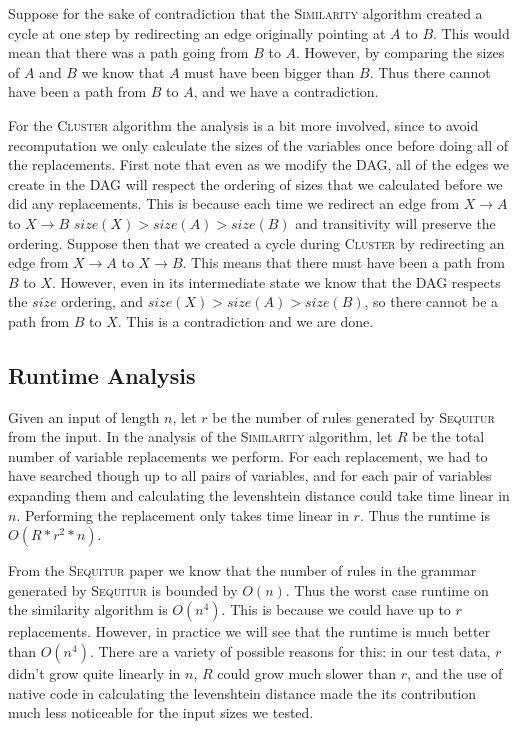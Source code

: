 \documentclass[11pt]{article}
\newcommand{\Sequitur}{\textsc{Sequitur}\xspace}
\newcommand{\Similarity}{\textsc{Similarity}\xspace}
\newcommand{\Cluster}{\textsc{Cluster}\xspace}
\begin{document}
Suppose for the sake of contradiction that the \Similarity algorithm created a
cycle at one step by redirecting an edge originally pointing at $A$ to $B$.
This would mean that there was a path going from $B$ to $A$. However, by
comparing the sizes of $A$ and $B$ we know that $A$ must have been bigger than
$B$. Thus there cannot have been a path from $B$ to $A$, and we have a
contradiction.

For the \Cluster algorithm the analysis is a bit more involved, since to avoid
recomputation we only calculate the sizes of the variables once before doing
all of the replacements. First note that even as we modify the DAG, all of the
edges we create in the DAG will respect the ordering of sizes that we
calculated before we did any replacements. This is because each time we
redirect an edge from $X\rightarrow A$ to $X\rightarrow B$
$size(X)>size(A)>size(B)$ and transitivity will preserve the ordering.
Suppose then that we created a cycle during \Cluster by redirecting an edge from
$X \rightarrow A$ to $X \rightarrow B$.  This means that there must have been a
path from $B$ to $X$. However, even in its intermediate state we know that the
DAG respects the $size$ ordering, and $size(X) > size(A) > size(B)$, so there
cannot be a path from $B$ to $X$. This is a contradiction and we are done.

\subsection{Runtime Analysis}

Given an input of length $n$, let $r$ be the number of rules generated by
\Sequitur from the input.  In the analysis of the \Similarity algorithm, let $R$
be the total number of variable replacements we perform. For each replacement,
we had to have searched though up to all pairs of variables, and for each pair
of variables expanding them and calculating the levenshtein distance could take
time linear in $n$.  Performing the replacement only takes time linear in $r$.
Thus the runtime is $\boxed{O(R*r^2*n)}$.

From the \Sequitur paper \cite{sequitur} we know that the number of rules in
the grammar generated by \Sequitur is bounded by $O(n)$. Thus the worst
case runtime on the similarity algorithm is $\boxed{O(n^4)}$. This is because
we could have up to $r$ replacements.  However, in practice we will see that
the runtime is much better than $O(n^4)$. There are a variety of possible
reasons for this: in our test data, $r$ didn't grow quite linearly in $n$, $R$
could grow much slower than $r$, and the use of native code in calculating the
levenshtein distance made the its contribution much less noticeable for the
input sizes we tested.
\end{document}
